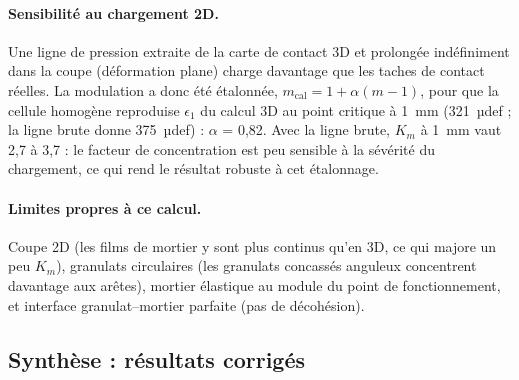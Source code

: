 \paragraph{Sensibilité au chargement 2D.} Une ligne de pression extraite de la carte de contact 3D
et prolongée indéfiniment dans la coupe (déformation plane) charge davantage que les taches de
contact réelles. La modulation a donc été étalonnée, $m_{\text{cal}}=1+\alpha(m-1)$, pour que la
cellule homogène reproduise $\epsilon_1$ du calcul 3D au point critique à \SI{1}{mm}
(321~µdef ; la ligne brute donne 375~µdef) :
$\alpha$ = 0,82. Avec la ligne brute, $K_m$ à \SI{1}{mm} vaut
2,7 à 3,7 : le facteur de concentration est peu sensible à la sévérité du
chargement, ce qui rend le résultat robuste à cet étalonnage.

\paragraph{Limites propres à ce calcul.} Coupe 2D (les films de mortier y sont plus continus
qu'en 3D, ce qui majore un peu $K_m$), granulats circulaires (les granulats concassés anguleux
concentrent davantage aux arêtes), mortier élastique au module du point de fonctionnement, et
interface granulat--mortier parfaite (pas de décohésion).
\subsection{Synthèse : résultats corrigés}\label{sec:n2_synthese}


